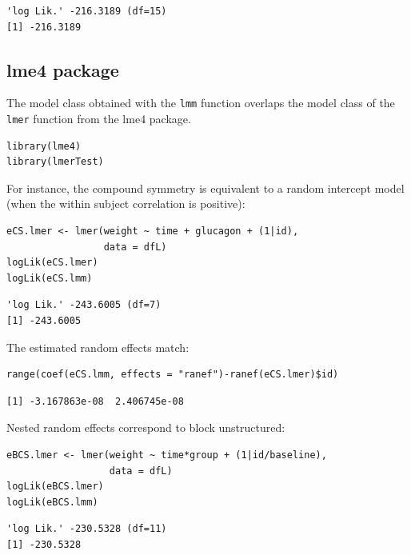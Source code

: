 \documentclass[12pt]{article}
\begin{document}
\begin{verbatim}
'log Lik.' -216.3189 (df=15)
[1] -216.3189
\end{verbatim}


\clearpage

\subsection{lme4 package}
\label{sec:org12f39e0}

The model class obtained with the \texttt{lmm} function overlaps the model
class of the \texttt{lmer} function from the lme4 package.
\lstset{language=r,label= ,caption= ,captionpos=b,numbers=none}
\begin{lstlisting}
library(lme4)
library(lmerTest)
\end{lstlisting}

For instance, the compound symmetry is equivalent to a random
intercept model (when the within subject correlation is positive):
\lstset{language=r,label= ,caption= ,captionpos=b,numbers=none}
\begin{lstlisting}
eCS.lmer <- lmer(weight ~ time + glucagon + (1|id),
                 data = dfL)
logLik(eCS.lmer)
logLik(eCS.lmm)
\end{lstlisting}

\begin{verbatim}
'log Lik.' -243.6005 (df=7)
[1] -243.6005
\end{verbatim}


The estimated random effects match:
\lstset{language=r,label= ,caption= ,captionpos=b,numbers=none}
\begin{lstlisting}
range(coef(eCS.lmm, effects = "ranef")-ranef(eCS.lmer)$id)
\end{lstlisting}

\begin{verbatim}
[1] -3.167863e-08  2.406745e-08
\end{verbatim}


Nested random effects correspond to block unstructured:
\lstset{language=r,label= ,caption= ,captionpos=b,numbers=none}
\begin{lstlisting}
eBCS.lmer <- lmer(weight ~ time*group + (1|id/baseline),
                  data = dfL)
logLik(eBCS.lmer)
logLik(eBCS.lmm)
\end{lstlisting}

\begin{verbatim}
'log Lik.' -230.5328 (df=11)
[1] -230.5328
\end{verbatim}
\end{document}
